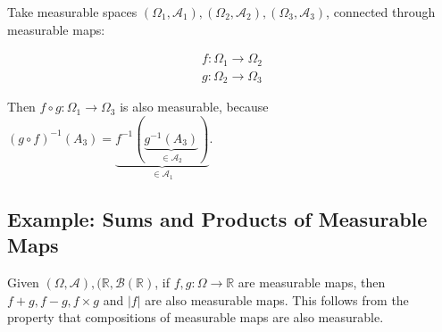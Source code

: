 Take measurable spaces $(\Omega_1,\mathscr{A}_1),(\Omega_2,\mathscr{A}_2),(\Omega_3,\mathscr{A}_3)$,  connected through measurable maps:

\begin{equation}
\begin{array}{l}
f: \Omega_1 \rightarrow \Omega_2 \\
g: \Omega_2 \rightarrow \Omega_3
\end{array}
\end{equation}

Then $f \circ g: \Omega_1 \rightarrow \Omega_3$ is also measurable, because $(g\circ f)^{-1}(A_3) = \underbrace{f^{-1}(\underbrace{g^{-1}(A_3)}_{\in \mathscr{A}_2})}_{\in \mathscr{A}_1}$.	 


\subsection{Example: Sums and Products of Measurable Maps}
Given $(\Omega,\mathscr{A}), (\mathbb{R},\mathscr{B}(\mathbb{R})$, if $f,g: \Omega \rightarrow \mathbb{R}$ 	are measurable maps, then $f+g, f-g, f\times g$ and $|f|$ are also measurable maps. This follows from the property that compositions of measurable maps are also measurable.


